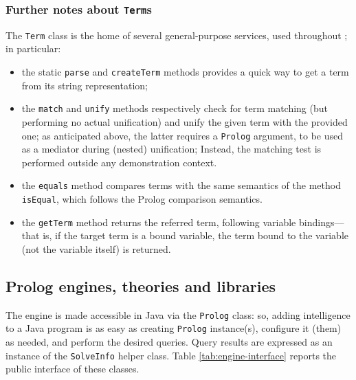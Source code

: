 \subsubsection{Further notes about \texttt{Term}s}

The \texttt{Term} class is the home of several general-purpose services, used throughout \tuprolog{}; in particular:

\begin{itemize}
\item the static \texttt{parse} and \texttt{createTerm} methods provides a quick way  to get a term from its string representation;

\item the \texttt{match} and \texttt{unify} methods respectively check for term matching (but performing no actual unification) and unify the given term with the provided one; as anticipated above, the latter requires a \texttt{Prolog} argument, to be used as a mediator during (nested) unification;
    Instead, the matching test is performed outside any demonstration context.

\item the \texttt{equals} method compares terms with the same semantics of the method \texttt{isEqual}, which follows the Prolog comparison semantics.

\item the \texttt{getTerm} method returns the referred term, following variable bindings---that is, if the target term is a bound variable, the term bound to the variable (not the variable itself) is returned.
\end{itemize}


\subsection{Prolog engines, theories and libraries}
\label{ssec:java-api-engine-solveinfo}

The \tuprolog{} engine is made accessible in Java via the \texttt{Prolog} class: so, adding intelligence to a Java program is as easy as creating \texttt{Prolog} instance(s), configure it (them) as needed, and perform the desired queries. Query results are expressed as an instance of the \texttt{SolveInfo} helper class.
Table \ref{tab:engine-interface} reports the public interface of these classes.

